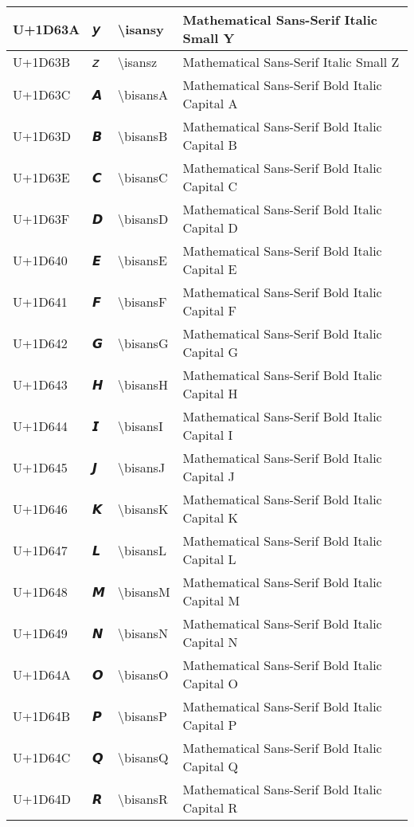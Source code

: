 \begin{table}[h]
\begin{tabulary}{\linewidth}{|L|L|L|L|}
\hline
U+1D63A & 𝘺 & {\textbackslash}isansy & Mathematical Sans-Serif Italic Small Y \\
\hline
U+1D63B & 𝘻 & {\textbackslash}isansz & Mathematical Sans-Serif Italic Small Z \\
\hline
U+1D63C & 𝘼 & {\textbackslash}bisansA & Mathematical Sans-Serif Bold Italic Capital A \\
\hline
U+1D63D & 𝘽 & {\textbackslash}bisansB & Mathematical Sans-Serif Bold Italic Capital B \\
\hline
U+1D63E & 𝘾 & {\textbackslash}bisansC & Mathematical Sans-Serif Bold Italic Capital C \\
\hline
U+1D63F & 𝘿 & {\textbackslash}bisansD & Mathematical Sans-Serif Bold Italic Capital D \\
\hline
U+1D640 & 𝙀 & {\textbackslash}bisansE & Mathematical Sans-Serif Bold Italic Capital E \\
\hline
U+1D641 & 𝙁 & {\textbackslash}bisansF & Mathematical Sans-Serif Bold Italic Capital F \\
\hline
U+1D642 & 𝙂 & {\textbackslash}bisansG & Mathematical Sans-Serif Bold Italic Capital G \\
\hline
U+1D643 & 𝙃 & {\textbackslash}bisansH & Mathematical Sans-Serif Bold Italic Capital H \\
\hline
U+1D644 & 𝙄 & {\textbackslash}bisansI & Mathematical Sans-Serif Bold Italic Capital I \\
\hline
U+1D645 & 𝙅 & {\textbackslash}bisansJ & Mathematical Sans-Serif Bold Italic Capital J \\
\hline
U+1D646 & 𝙆 & {\textbackslash}bisansK & Mathematical Sans-Serif Bold Italic Capital K \\
\hline
U+1D647 & 𝙇 & {\textbackslash}bisansL & Mathematical Sans-Serif Bold Italic Capital L \\
\hline
U+1D648 & 𝙈 & {\textbackslash}bisansM & Mathematical Sans-Serif Bold Italic Capital M \\
\hline
U+1D649 & 𝙉 & {\textbackslash}bisansN & Mathematical Sans-Serif Bold Italic Capital N \\
\hline
U+1D64A & 𝙊 & {\textbackslash}bisansO & Mathematical Sans-Serif Bold Italic Capital O \\
\hline
U+1D64B & 𝙋 & {\textbackslash}bisansP & Mathematical Sans-Serif Bold Italic Capital P \\
\hline
U+1D64C & 𝙌 & {\textbackslash}bisansQ & Mathematical Sans-Serif Bold Italic Capital Q \\
\hline
U+1D64D & 𝙍 & {\textbackslash}bisansR & Mathematical Sans-Serif Bold Italic Capital R \\

\end{tabulary}
\end{table}
